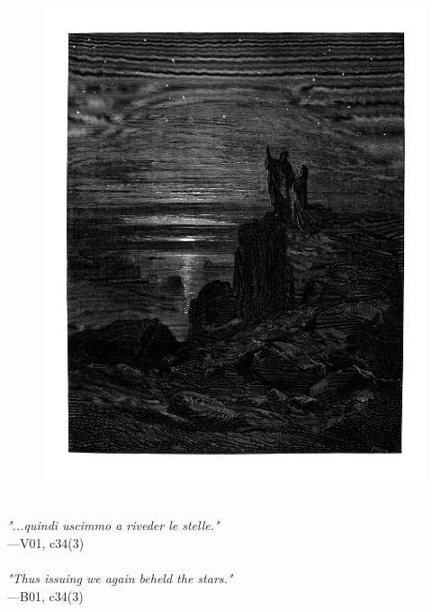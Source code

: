 \documentclass[../Dore_vision.tex]{subfiles}
\begin{document}
\begin{figure}[ht]
\centering
\includegraphics[height=\figsize]{illustrations/book_1/V01, c34(3).jpg}
\end{figure}

\begin{center}
\begin{minipage}{0.8\linewidth}
\textit{\\
"...quindi uscimmo a riveder le stelle."} \\
—V01, c34(3) \\~\\
\textit{"Thus issuing we again beheld the stars."} \\
—B01, c34(3)
\end{minipage}
\end{center}
\end{document}
